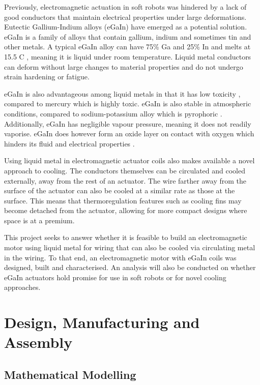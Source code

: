 \documentclass[a4paper,12pt]{article}
\begin{document}
Previously, electromagnetic actuation in soft robots was hindered by a lack of good conductors that maintain electrical properties under large deformations. Eutectic Gallium-Indium alloys (eGaIn) have emerged as a potential solution. eGaIn is a family of alloys that contain gallium, indium and sometimes tin and other metals. A typical eGaIn alloy can have 75\% Ga and 25\% In and melts at 15.5 \degree C \cite{dickeyEutecticGalliumIndiumEGaIn2008}, meaning it is liquid under room temperature. Liquid metal conductors can deform without large changes to material properties and do not undergo strain hardening or fatigue.

eGaIn is also advantageous among liquid metals in that it has low toxicity \cite{dickeyEutecticGalliumIndiumEGaIn2008}, compared to mercury which is highly toxic. eGaIn is also stable in atmospheric conditions, compared to sodium-potassium alloy which is pyrophoric \cite{houghtonHazards2007}. Additionally, eGaIn has negligible vapour pressure, meaning it does not readily vaporise. eGaIn does however form an oxide layer on contact with oxygen which hinders its fluid and electrical properties \cite{liuCharacterizationNontoxicLiquidMetal2012}.

Using liquid metal in electromagnetic actuator coils also makes available a novel approach to cooling. The conductors themselves can be circulated and cooled externally, away from the rest of an actuator. The wire farther away from the surface of the actuator can also be cooled at a similar rate as those at the surface. This means that thermoregulation features such as cooling fins may become detached from the actuator, allowing for more compact designs where space is at a premium.

This project seeks to answer whether it is feasible to build an electromagnetic motor using liquid metal for wiring that can also be cooled via circulating metal in the wiring. To that end, an electromagnetic motor with eGaIn coils was designed, built and characterised. An analysis will also be conducted on whether eGaIn actuators hold promise for use in soft robots or for novel cooling approaches.

\newpage

\section{Design, Manufacturing and Assembly}
\subsection{Mathematical Modelling} \label{section:mm}
\end{document}
